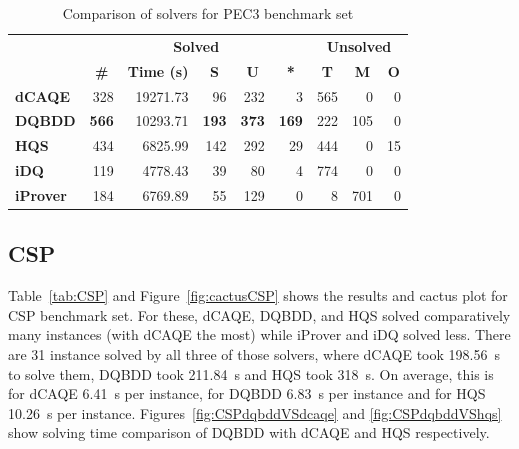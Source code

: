 \documentclass[
  digital, %
  color,
  twoside, %
  table,   %
  nolof,     %
  nolot,     %
]{fithesis3}
\theoremstyle{definition}
\theoremstyle{remark}
\begin{document}
\begin{table}[ht]
\centering
\caption{Comparison of solvers for PEC3 benchmark set}%
\label{tab:PEC3}
\begin{tabular}{|l|r|r|r|r|r|r|r|r|}
\hline
\multicolumn{1}{|c|}{}                                  & \multicolumn{5}{c|}{\textbf{Solved}}                                                                                                                                        & \multicolumn{3}{c|}{\textbf{Unsolved}}                                                                 \\  \hhline{~*{8}{-}}
\multicolumn{1}{|c|}{\multirow{-2}{*}{\textbf{Solver}}} & \multicolumn{1}{c|}{\textbf{\#}} & \multicolumn{1}{c|}{\textbf{Time (s)}} & \multicolumn{1}{c|}{\textbf{S}} & \multicolumn{1}{c|}{\textbf{U}} & \multicolumn{1}{c|}{\textbf{*}} & \multicolumn{1}{c|}{\textbf{T}} & \multicolumn{1}{c|}{\textbf{M}} & \multicolumn{1}{c|}{\textbf{O}} \\ \hline
\textbf{dCAQE} & \num{328} & \num{19271.73} & \num{96} & \num{232} & \num{3} & \num{565} & \num{0} & \phantom{00}\num{0} \\ \hline
\textbf{DQBDD} & \textbf{566} & \num{10293.71} & \textbf{193} & \textbf{373} & \textbf{169} & \num{222} & \num{105} & \num{0} \\ \hline
\textbf{HQS} & \num{434} & \num{6825.99} & \num{142} & \num{292} & \num{29} & \num{444} & \num{0} & \num{15} \\ \hline
\textbf{iDQ} & \num{119} & \num{4778.43} & \num{39} & \num{80} & \num{4} & \num{774} & \num{0} & \num{0} \\ \hline
\textbf{iProver} & \num{184} & \num{6769.89} & \num{55} & \num{129} & \num{0} & \num{8} & \num{701} & \num{0} \\ \hline
\end{tabular}
\end{table}

\subsection{CSP}
Table~\ref{tab:CSP} and Figure~\ref{fig:cactusCSP} shows the results and cactus plot for CSP benchmark set. For these, dCAQE, DQBDD, and HQS solved comparatively many instances (with dCAQE the most) while iProver and iDQ solved less. There are 31 instance solved by all three of those solvers, where dCAQE took \SI{198.56}{s} to solve them, DQBDD took \SI{211.84}{s} and HQS took \SI{318}{s}. On average, this is for dCAQE \SI{6.41}{s} per instance, for DQBDD \SI{6.83}{s} per instance and for HQS \SI{10.26}{s} per instance. Figures~\ref{fig:CSPdqbddVSdcaqe} and \ref{fig:CSPdqbddVShqs} show solving time comparison of DQBDD with dCAQE and HQS respectively.
\end{document}
